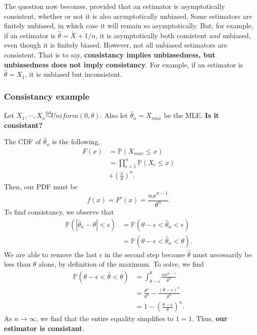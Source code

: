 \documentclass[titlepage, 12pt, leqno]{article}
\begin{document}
The question now becomes, provided that an estimator is asymptotically
consistent, whether or not it is also asymptotically unbiased. Some estimators
are finitely unbiased, in which case it will remain so asymptotically. But,
for example, if an estimator is $\hat \theta = \bar X + 1/n$, it is 
asymptotically both consistent \textit{and} unbiased, even though it is 
finitely biased. However, not all unbiased estimators are consistent. That is
to say, \textbf{consistancy implies unbiasedness, but unbiasedness does not
imply consistancy}. For example, if an estimator is $\hat \theta = X_{1}$, it
is unbiased but inconsistent.

\subsubsection{Consistancy example}
Let $X_{1}, \cdots ,X_{n} \overset{\mathrm{iid}}{\sim}Uniform(0, \theta)$. Also
let $\hat \theta_{n} = X_{max}$ be the MLE. \textbf{Is it consistant?}

The CDF of $\hat \theta_{n}$ is the following,
\begin{align*}
    F(x) &= \mathbb{P}(X_{max} \le x) \\
         &= \prod_{i=1}^{n} \mathbb{P}(X_{i} \le x) \\
         &+ \left(\frac{x}{\theta}\right)^{n}.
\end{align*}
Then, our PDF must be
\[
f(x) = F'(x) = \frac{nx^{n-1}}{\theta^{n}}.
\]
To find consistancy, we observe that
\begin{align*}
    \mathbb{P}(|\hat \theta_{n} - \theta| < \epsilon) &= \mathbb{P}(\theta -
    \epsilon < \hat \theta_{n} < \epsilon) \\
                  &= \mathbb{P}(\theta - \epsilon < \hat \theta_{n} < \theta).
\end{align*}
We are able to remove the last $\epsilon$ in the second step because $\hat 
\theta$ must necessarily be less than $\theta$ alone, by definition of the
maximum. To solve, we find
\begin{align*}
    \mathbb{P}(\theta - \epsilon < \hat \theta < \theta)
    &= \int_{\theta-\epsilon}^{\theta} \frac{nx^{n-1}}{\theta^{n}} \\
    &= \frac{\theta^{n}}{\theta^{n}} - \frac{(\theta-\epsilon)^{n}}{\theta^{n}}\\
    &= 1 - \left(\frac{\theta-\epsilon}{\theta}\right)^{n}.
\end{align*}
As $n \rightarrow \infty$, we find that the entire equality simplifies to
$1=1$. Thus, \textbf{our estimator is consistant}.
\end{document}
